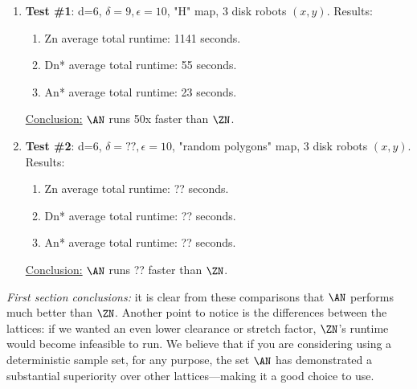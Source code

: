 \begin{enumerate}
    \item \textbf{Test \#1}: d=6, $\delta=9, \epsilon=10$, "H" map, 3 disk robots $(x,y)$. Results:
    \begin{enumerate}
        \item Zn average total runtime: 1141 seconds.
        \item Dn* average total runtime: 55 seconds.
        \item An* average total runtime: 23 seconds.
    \end{enumerate}
    \underline{Conclusion:} $\AN$ runs 50x faster than $\ZN$.
    \item \textbf{Test \#2}: d=6, $\delta=??, \epsilon=10$, "random polygons" map, 3 disk robots $(x,y)$. Results:
    \begin{enumerate}
        \item Zn average total runtime: ?? seconds.
        \item Dn* average total runtime: ?? seconds.
        \item An* average total runtime: ?? seconds.
    \end{enumerate}
    \underline{Conclusion:} $\AN$ runs ?? faster than $\ZN$.
\end{enumerate}
\emph{First section conclusions:} it is clear from these comparisons that $\AN$ performs much better than $\ZN$. Another point to notice is the differences between the lattices: if we wanted an even lower clearance or stretch factor, $\ZN$'s runtime would become infeasible to run. We believe that if you are considering using a deterministic sample set, for any purpose, the set $\AN$ has demonstrated a substantial superiority over other lattices---making it a good choice to use.